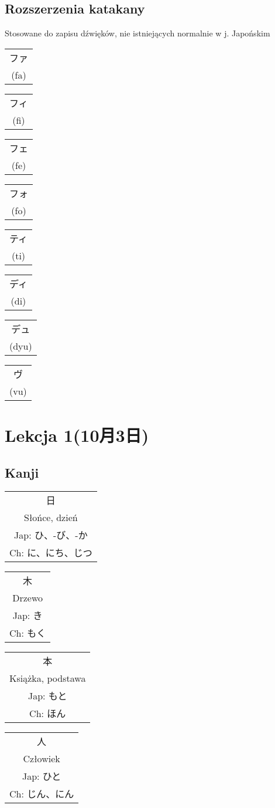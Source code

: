 \documentclass[10pt, a4paper]{article}
\newcommand{\kanji}[4]{
	\begin{tabular}{c}
		{\fontsize{50}{60}\selectfont #1} \\
		#2 \\
		Jap: #3 \\
		Ch: #4 \\
	\end{tabular}
}
\begin{document}
	\subsection{Rozszerzenia katakany}
	Stosowane do zapisu dźwięków, nie istniejących normalnie w j. Japońskim \\
	\begin{tabular}{c}ファ \\ (fa) \end{tabular}
	\begin{tabular}{c}フィ \\ (fi) \end{tabular}
	\begin{tabular}{c}フェ \\ (fe) \end{tabular}
	\begin{tabular}{c}フォ \\ (fo) \end{tabular}
	\begin{tabular}{c}ティ \\ (ti) \end{tabular}
	\begin{tabular}{c}ディ \\ (di) \end{tabular}
	\begin{tabular}{c}デュ \\ (dyu) \end{tabular}
	\begin{tabular}{c}ヴ \\ (vu) \end{tabular}
	\newpage
	
	\section{Lekcja 1(10月3日)}
	\subsection{Kanji}
	\kanji{日}{Słońce, dzień}{ひ、-び、-か}{に、にち、じつ}
	\kanji{木}{Drzewo}{き}{もく}
	\kanji{本}{Książka, podstawa}{もと}{ほん}
	\kanji{人}{Człowiek}{ひと}{じん、にん}
\end{document}
